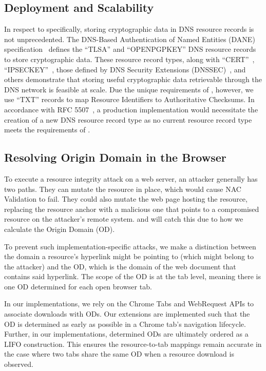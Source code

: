 \subsection{Deployment and Scalability}


In respect to \DNSSYS{} specifically, storing cryptographic data in DNS resource
records is not unprecedented. The DNS-Based Authentication of Named Entities
(DANE) specification~\cite{DANE1, DANE2, DANE3} defines the ``TLSA'' and
``OPENPGPKEY'' DNS resource records to store cryptographic data. These resource
record types, along with ``CERT''~\cite{CERT}, ``IPSECKEY''~\cite{IPSECKEY},
those defined by DNS Security Extensions (DNSSEC)~\cite{DNSSEC}, and others
demonstrate that storing useful cryptographic data retrievable through the DNS
network is feasible at scale. Due the unique requirements of \DNSSYS{}, however,
we use ``TXT'' records to map Resource Identifiers to Authoritative Checksums.
In accordance with RFC 5507~\cite{RFC5507}, a production \DNSSYS{}
implementation would necessitate the creation of a new DNS resource record type
as no current resource record type meets the requirements of \DNSSYS{}.

\subsection{Resolving Origin Domain in the Browser}

To execute a resource integrity attack on a web server, an attacker generally
has two paths. They can mutate the resource in place, which would cause NAC
Validation to fail. They could also mutate the web page hosting the resource,
replacing the resource anchor with a malicious one that points to a compromised
resource on the attacker's remote system. \DNSSYS{} and \DHTSYS{} will catch
this due to how we calculate the Origin Domain (OD).

To prevent such implementation-specific attacks, we make a distinction between
the domain a resource's hyperlink might be pointing to (which might belong to
the attacker) and the OD, which is the domain of the web document that contains
said hyperlink. The scope of the OD is at the tab level, meaning there is one OD
determined for each open browser tab.

In our implementations, we rely on the Chrome Tabs and WebRequest APIs to
associate downloads with ODs. Our extensions are implemented such that the OD is
determined as early as possible in a Chrome tab's navigation lifecycle. Further,
in our implementations, determined ODs are ultimately ordered as a LIFO
construction. This ensures the resource-to-tab mappings remain accurate in the
case where two tabs share the same OD when a resource download is observed.

